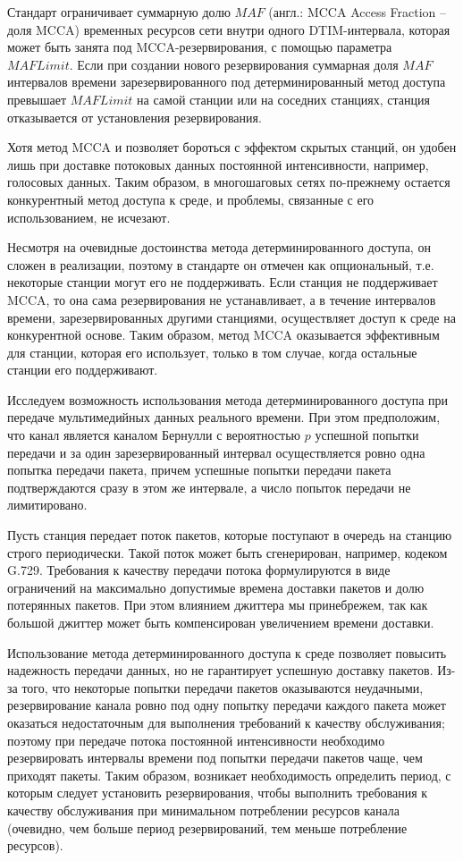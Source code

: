 Стандарт ограничивает суммарную долю $MAF$ (англ.: MCCA Access Fraction -- доля MCCA) временных ресурсов сети внутри одного DTIM-интервала, которая может быть занята под  MCCA-резервирования, с помощью параметра $MAFLimit$. Если при создании нового резервирования суммарная доля $MAF$ интервалов времени зарезервированного под детерминированный метод доступа превышает $MAFLimit$ на самой станции или на соседних станциях, станция отказывается от установления резервирования.

Хотя метод MCCA и позволяет бороться с эффектом скрытых станций, он удобен лишь при доставке потоковых данных постоянной интенсивности, например,  голосовых данных. Таким образом, в многошаговых сетях по-прежнему остается конкурентный метод доступа к среде, и проблемы, связанные с его использованием, не исчезают.

Несмотря на очевидные достоинства метода детерминированного доступа, он сложен в реализации, поэтому в стандарте он отмечен как опциональный, т.е. некоторые станции могут его не поддерживать. Если станция не поддерживает MCCA, то она сама резервирования не устанавливает, а в течение интервалов времени, зарезервированных другими станциями, осуществляет доступ к среде на конкурентной основе. Таким образом, метод MCCA оказывается эффективным для станции, которая его использует, только в том случае, когда остальные станции его поддерживают.

Исследуем возможность использования метода детерминированного доступа при передаче мультимедийных данных реального времени. При этом предположим, что канал является каналом Бернулли с вероятностью  $p$ успешной попытки передачи и за один зарезервированный интервал осуществляется ровно одна попытка передачи пакета, причем успешные попытки передачи пакета подтверждаются сразу в этом же интервале, а число попыток передачи не лимитировано.

Пусть станция передает поток пакетов, которые поступают в очередь на станцию строго периодически. Такой поток может быть сгенерирован, например, кодеком G.729. Требования к качеству передачи потока формулируются в виде ограничений на максимально допустимые времена доставки пакетов и долю потерянных пакетов. При этом влиянием джиттера мы принебрежем, так как большой джиттер может быть компенсирован увеличением времени доставки.

Использование метода детерминированного доступа к среде позволяет повысить надежность передачи данных, но не гарантирует успешную доставку пакетов. Из-за того, что некоторые попытки передачи пакетов оказываются неудачными, резервирование канала ровно под одну попытку передачи каждого пакета может оказаться недостаточным для выполнения требований к качеству обслуживания; поэтому при передаче потока постоянной интенсивности необходимо резервировать интервалы времени под попытки передачи пакетов чаще, чем приходят пакеты. Таким образом, возникает необходимость определить период, с которым следует установить резервирования, чтобы выполнить требования к качеству обслуживания при минимальном потреблении ресурсов канала (очевидно, чем больше период резервирований, тем меньше потребление ресурсов).

